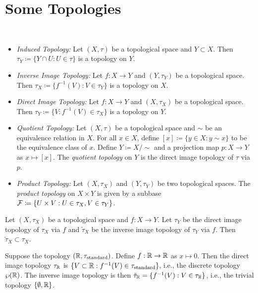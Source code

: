 \documentclass{techreport}
\begin{document}
\section{Some Topologies}

\begin{definition}\
	\begin{itemize}
		\item \emph{Induced Topology:} Let $(X,\tau)$ be a topological space and $Y \subset X$.
		Then $\tau_Y \coloneqq \{ Y \cap U : U \in \tau \}$ is a topology on $Y$.
		\item \emph{Inverse Image Topology:} Let $f : X \to Y$ and $(Y,\tau_Y)$ be a topological space. Then $\tau_X \coloneqq \{ f^{-1}(V) : V \in \tau_Y \}$ is a topology on $X$.
		\item \emph{Direct Image Topology:} Let $f : X \to Y$ and $(X,\tau_X)$ be a topological space. Then $\tau_Y \coloneqq \{ V : f^{-1}(V) \in \tau_X \}$ is a topology on $Y$.
		\item \emph{Quotient Topology:} Let $(X,\tau)$ be a topological space and ${\sim}$ be an equivalence relation in $X$.
		For all $x \in X$, define $[x] \coloneqq \{ y \in X : y \sim x \}$ to be the equivalence class of $x$.
		Define $Y \coloneqq X /{\sim}$ and a projection map $p : X \to Y$ as $x \mapsto [x]$.
		The \emph{quotient topology} on $Y$ is the direct image topology of $\tau$ via $p$.
		\item \emph{Product Topology:} Let $(X,\tau_X)$ and $(Y,\tau_Y)$ be two topological spaces.
		The \emph{product topology} on $X \times Y$ is given by a subbase $\mathcal{F} \coloneqq \{ U \times V : U \in \tau_X, V \in \tau_Y \}$.
	\end{itemize}
\end{definition}

\begin{remark}
	Let $(X,\tau_X)$ be a topological space and $f : X \to Y$.
	Let $\tau_Y$ be the direct image topology of $\tau_X$ via $f$ and $\tilde{\tau}_X$ be the inverse image topology of $\tau_Y$ via $f$.
	Then $\tilde{\tau}_X \subset \tau_X$.
\end{remark}

\begin{remark}
	Suppose the topology $(\mathbb{R},\tau_{\mathrm{standard}})$.
	Define $f : \mathbb{R} \to \mathbb{R}$ as $x \mapsto 0$.
	Then the direct image topology $\tau_{\mathbb{R}}$ is $\{ V \subset \mathbb{R} : f^{-1}(V) \in \tau_\mathrm{standard} \}$, i.e., the discrete topology $\wp(\mathbb{R})$.
	The inverse image topology is then $\tilde{\tau}_{\mathbb{R}} = \{ f^{-1}(V) : V \in \tau_{\mathbb{R}} \}$, i.e., the trivial topology $\{ \emptyset, \mathbb{R} \}$.
\end{remark}
\end{document}
